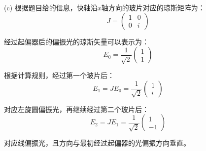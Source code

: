 \begin{solution}[Polarization]
    (c) 根据题目给的信息，快轴沿$x$轴方向的玻片对应的琼斯矩阵为：
    \[J = \left(\begin{matrix}1 & 0\\ 0 & i\end{matrix}\right)\]

    经过起偏器后的偏振光的琼斯矢量可以表示为：
    \[E_0 = \dfrac{1}{\sqrt{2}}\left(\begin{matrix}1\\ 1\end{matrix}\right)\]

    根据计算规则，经过第一个玻片后：
    \[E_1 = JE_0 = \dfrac{1}{\sqrt{2}}\left(\begin{matrix}1\\ i\end{matrix}\right)\]

    对应左旋圆偏振光，再继续经过第二个玻片后：
    \[E_2 = JE_1 = \dfrac{1}{\sqrt{2}}\left(\begin{matrix}1\\ -1\end{matrix}\right)\]

    对应线偏振光，且方向与最初经过起偏器的光偏振方向垂直。
\end{solution}

